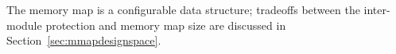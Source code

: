 %
The memory map is a configurable data structure; tradeoffs between
the inter-module protection and memory map size are discussed in
Section~\ref{sec:mmapdesignspace}.
%
%
%
%
%
%
%
%
